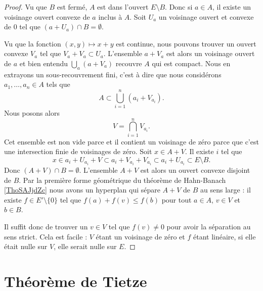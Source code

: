 \begin{proof}
    Vu que \( B\) est fermé, \( A\) est dans l'ouvert \( E\setminus B\). Donc si \( a\in A\), il existe un voisinage ouvert convexe de \( a\) inclus à \( A\). Soit \( U_a\) un voisinage ouvert et convexe de \( 0\) tel que \( (a+U_a)\cap B=\emptyset\).

    Vu que la fonction \( (x,y)\mapsto x+y\) est continue, nous pouvons trouver un ouvert convexe \( V_a\) tel que \( V_a+V_a\subset U_a\). L'ensemble \( a+V_a\) est alors un voisinage ouvert de \( a\) et bien entendu \( \bigcup_a(a+V_a)\) recouvre \( A\) qui est compact. Nous en extrayons un sous-recouvrement fini, c'est à dire que nous considérons \( a_1,\ldots, a_n\in A\) tels que
    \begin{equation}
        A\subset \bigcup_{i=1}^n(a_i+V_{a_i}).
    \end{equation}
    Nous posons alors 
    \begin{equation}
        V=\bigcap_{i=1}^nV_{a_i}.
    \end{equation}
    Cet ensemble est non vide parce et il contient un voisinage de zéro parce que c'est une intersection finie de voisinages de zéro. Soit \( x\in A+V\). Il existe \( i\) tel que 
    \begin{equation}
        x\in a_i+U_{a_i}+V\subset a_i+V_{a_i}+V_{a_i}\subset a_i+U_{a_i}\subset E\setminus B.
    \end{equation}
    Donc \( (A+V)\cap B=\emptyset\). L'ensemble \( A+V\) est alors un ouvert convexe disjoint de \( B\). Par la première forme géométrique du théorème de Hahn-Banach \ref{ThoSAJjdZc} nous avons un hyperplan qui sépare \( A+V\) de \( B\) au sens large : il existe \( f\in E'\setminus\{ 0 \}\) tel que \( f(a)+f(v)\leq f(b)\) pour tout \( a\in A\), \( v\in V\) et \( b\in B\). 
    
    Il suffit donc de trouver un \( v\in V\) tel que \( f(v)\neq 0\) pour avoir la séparation au sens strict. Cela est facile : \( V\) étant un voisinage de zéro et \( f\) étant linéaire, si elle était nulle sur \( V\), elle serait nulle sur \( E\).
\end{proof}

\section{Théorème de Tietze}

